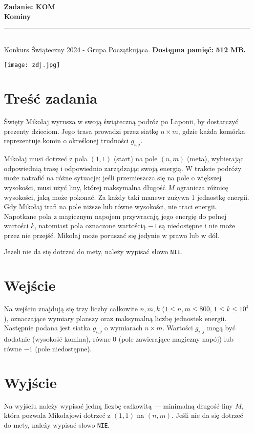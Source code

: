\documentclass[a4paper,11pt]{article}
\newcommand{\tasktitle}{Kominy}
\newcommand{\taskshort}{KOM}
\newcommand{\contestinfo}{Konkurs Świąteczny 2024 - Grupa Początkująca.}
\newcommand{\memorylimit}{512 MB}
\begin{document}
\noindent\textbf{\LARGE Zadanie: \taskshort} \\
\textbf{\Large \tasktitle} \\
\rule{\textwidth}{0.4pt} \\
\small \contestinfo \textbf{ Dostępna pamięć: \memorylimit.}

\begin{center}
\texttt{[image: zdj.jpg]}
\end{center}

\section*{Tre\'s\'c zadania}
\noindent\normalsize
Święty Mikołaj wyrusza w swoją świąteczną podróż po Laponii, by dostarczyć prezenty dzieciom. Jego trasa prowadzi przez siatkę \( n \times m \), gdzie każda komórka reprezentuje komin o określonej trudności \( g_{i,j} \).

Mikołaj musi dotrzeć z pola \((1, 1)\) (start) na pole \((n, m)\) (meta), wybierając odpowiednią trasę i odpowiednio zarządzając swoją energią. W trakcie podróży może natrafić na różne sytuacje: jeśli przemieszcza się na pole o większej wysokości, musi użyć liny, której maksymalna długość \( M \) ogranicza różnicę wysokości, jaką może pokonać. Za każdy taki manewr zużywa 1 jednostkę energii. Gdy Mikołaj trafi na pole niższe lub równe wysokości, nie traci energii. Napotkane pola z magicznym napojem przywracają jego energię do pełnej wartości \( k \), natomiast pola oznaczone wartością \( -1 \) są niedostępne i nie może przez nie przejść. Mikołaj może poruszać się jedynie w prawo lub w dół.

Jeżeli nie da się dotrzeć do mety, należy wypisać słowo \texttt{NIE}.

\section*{Wejście}
Na wejściu znajdują się trzy liczby całkowite \( n, m, k \) ($1 \leq n, m \leq 800$, \( 1 \leq k \leq 10^4 \)), oznaczające wymiary planszy oraz maksymalną liczbę jednostek energii. Następnie podana jest siatka \( g_{i,j} \) o wymiarach \( n \times m \). Wartości \( g_{i,j} \) mogą być dodatnie (wysokość komina), równe 0 (pole zawierające magiczny napój) lub równe \( -1 \) (pole niedostępne).

\section*{Wyjście}
Na wyjściu należy wypisać jedną liczbę całkowitą — minimalną długość liny \( M \), która pozwala Mikołajowi dotrzeć z \( (1, 1) \) na \( (n, m) \). Jeśli nie da się dotrzeć do mety, należy wypisać słowo \texttt{NIE}.
\newpage
\end{document}
